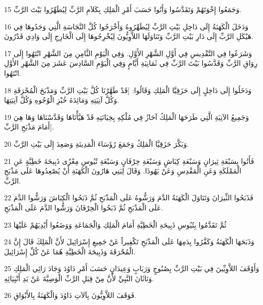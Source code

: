 \par 15 وَجَمَعُوا إِخْوَتَهُمْ وَتَقَدَّسُوا وَأَتُوا حَسَبَ أَمْرِ الْمَلِكِ بِكَلاَمِ الرَّبِّ لِيُطَهِّرُوا بَيْتَ الرَّبِّ.
\par 16 وَدَخَلَ الْكَهَنَةُ إِلَى دَاخِلِ بَيْتِ الرَّبِّ لِيُطَهِّرُوهُ وَأَخْرَجُوا كُلَّ النَّجَاسَةِ الَّتِي وَجَدُوهَا فِي هَيْكَلِ الرَّبِّ إِلَى دَارِ بَيْتِ الرَّبِّ وَتَنَاوَلَهَا اللاَّوِيُّونَ لِيُخْرِجُوهَا إِلَى الْخَارِجِ إِلَى وَادِي قَدْرُونَ.
\par 17 وَشَرَعُوا فِي التَّقْدِيسِ فِي أَوَّلِ الشَّهْرِ الأَوَّلِ. وَفِي الْيَوْمِ الثَّامِنِ مِنَ الشَّهْرِ انْتَهُوا إِلَى رِوَاقِ الرَّبِّ وَقَدَّسُوا بَيْتَ الرَّبِّ فِي ثَمَانِيَةِ أَيَّامٍ وَفِي الْيَوْمِ السَّادِسَ عَشَرَ مِنَ الشَّهْرِ الأَوَّلِ انْتَهُوا.
\par 18 وَدَخَلُوا إِلَى دَاخِلٍ إِلَى حَزَقِيَّا الْمَلِكِ وَقَالُوا: [قَدْ طَهَّرْنَا كُلَّ بَيْتِ الرَّبِّ وَمَذْبَحَ الْمُحْرَقَةِ وَكُلَّ آنِيَتِهِ وَمَائِدَةَ خُبْزِ الْوُجُوهِ وَكُلَّ آنِيَتِهَا.
\par 19 وَجَمِيعُ الآنِيَةِ الَّتِي طَرَحَهَا الْمَلِكُ آحَازُ فِي مُلْكِهِ بِخِيَانَتِهِ قَدْ هَيَّأْنَاهَا وَقَدَّسْنَاهَا وَهَا هِيَ أَمَامَ مَذْبَحِ الرَّبِّ].
\par 20 وَبَكَّرَ حَزَقِيَّا الْمَلِكُ وَجَمَعَ رُؤَسَاءَ الْمَدِينَةِ وَصَعِدَ إِلَى بَيْتِ الرَّبِّ.
\par 21 فَأَتُوا بِسَبْعَةِ ثِيرَانٍ وَسَبْعَةِ كِبَاشٍ وَسَبْعَةِ خِرْفَانٍ وَسَبْعَةِ تُيُوسِ مِعْزًى ذَبِيحَةَ خَطِيَّةٍ عَنِ الْمَمْلَكَةِ وَعَنِ الْمَقْدِسِ وَعَنْ يَهُوذَا. وَقَالَ لِبَنِي هَارُونَ الْكَهَنَةِ أَنْ يُصْعِدُوهَا عَلَى مَذْبَحِ الرَّبِّ.
\par 22 فَذَبَحُوا الثِّيرَانَ وَتَنَاوَلَ الْكَهَنَةُ الدَّمَ وَرَشُّوهُ عَلَى الْمَذْبَحِ ثُمَّ ذَبَحُوا الْكِبَاشَ وَرَشُّوا الدَّمَ عَلَى الْمَذْبَحِ ثُمَّ ذَبَحُوا الْخِرْفَانَ وَرَشُّوا الدَّمَ عَلَى الْمَذْبَحِ.
\par 23 ثُمَّ تَقَدَّمُوا بِتُيُوسِ ذَبِيحَةِ الْخَطِيَّةِ أَمَامَ الْمَلِكِ وَالْجَمَاعَةِ وَوَضَعُوا أَيْدِيَهُمْ عَلَيْهَا
\par 24 وَذَبَحَهَا الْكَهَنَةُ وَكَفَّرُوا بِدَمِهَا عَلَى الْمَذْبَحِ تَكْفِيراً عَنْ جَمِيعِ إِسْرَائِيلَ لأَنَّ الْمَلِكَ قَالَ إِنَّ الْمُحْرَقَةَ وَذَبِيحَةَ الْخَطِيَّةِ هُمَا عَنْ كُلِّ إِسْرَائِيلَ.
\par 25 وَأَوْقَفَ اللاَّوِيِّينَ فِي بَيْتِ الرَّبِّ بِصُنُوجٍ وَرَبَابٍ وَعِيدَانٍ حَسَبَ أَمْرِ دَاوُدَ وَجَادَ رَائِي الْمَلِكِ وَنَاثَانَ النَّبِيِّ لأَنَّ مِنْ قِبَلِ الرَّبِّ الْوَصِيَّةَ عَنْ يَدِ أَنْبِيَائِهِ.
\par 26 فَوَقَفَ اللاَّوِيُّونَ بِآلاَتِ دَاوُدَ وَالْكَهَنَةُ بِالأَبْوَاقِ.
